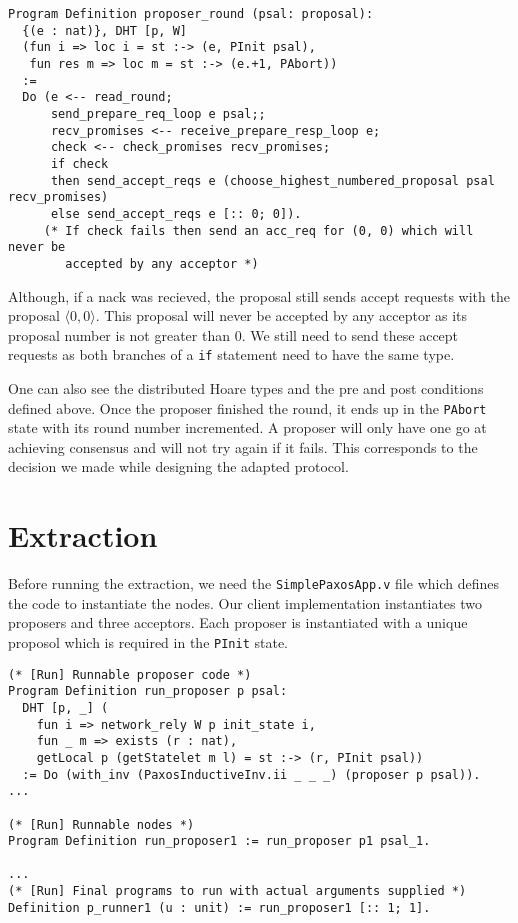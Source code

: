 \begin{lstlisting}
Program Definition proposer_round (psal: proposal):
  {(e : nat)}, DHT [p, W]
  (fun i => loc i = st :-> (e, PInit psal),
   fun res m => loc m = st :-> (e.+1, PAbort))
  :=
  Do (e <-- read_round;
      send_prepare_req_loop e psal;;
      recv_promises <-- receive_prepare_resp_loop e;
      check <-- check_promises recv_promises;
      if check
      then send_accept_reqs e (choose_highest_numbered_proposal psal recv_promises)
      else send_accept_reqs e [:: 0; 0]).
     (* If check fails then send an acc_req for (0, 0) which will never be
        accepted by any acceptor *)
\end{lstlisting}

Although, if a nack was recieved, the proposal still sends
accept requests with the proposal $\langle 0, 0 \rangle$. This proposal will
never be accepted by any acceptor as its proposal number is not greater than 0.
We still need to send these accept requests as both branches of a \texttt{if}
statement need to have the same type.

One can also see the distributed Hoare types and the pre and post conditions
defined above. Once the proposer finished the round, it ends up in the \texttt{PAbort}
state with its round number incremented. A proposer will only have one go at achieving
consensus and will not try again if it fails. This corresponds to the decision we
made while designing the adapted protocol.

\section{Extraction}
Before running the extraction, we need the \texttt{SimplePaxosApp.v} file
which defines the code to instantiate the nodes.
Our client implementation instantiates two proposers and three acceptors.
Each proposer is instantiated with a unique proposol which is required in the
\texttt{PInit} state.

\begin{lstlisting}
(* [Run] Runnable proposer code *)
Program Definition run_proposer p psal:
  DHT [p, _] (
    fun i => network_rely W p init_state i,
    fun _ m => exists (r : nat),
    getLocal p (getStatelet m l) = st :-> (r, PInit psal))
  := Do (with_inv (PaxosInductiveInv.ii _ _ _) (proposer p psal)).
...

(* [Run] Runnable nodes *)
Program Definition run_proposer1 := run_proposer p1 psal_1.

...
(* [Run] Final programs to run with actual arguments supplied *)
Definition p_runner1 (u : unit) := run_proposer1 [:: 1; 1].
\end{lstlisting}


